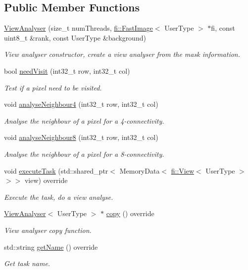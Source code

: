 \subsection*{Public Member Functions}
\begin{DoxyCompactItemize}
\item 
\hyperlink{classfc_1_1ViewAnalyser_a9bede8677246172230ddb1b70362d8a4}{View\+Analyser} (size\+\_\+t num\+Threads, \hyperlink{classfi_1_1FastImage}{fi\+::\+Fast\+Image}$<$ User\+Type $>$ $\ast$fi, const uint8\+\_\+t \&rank, const User\+Type \&background)
\begin{DoxyCompactList}\small\item\em View analyser constructor, create a view analyser from the mask information. \end{DoxyCompactList}\item 
bool \hyperlink{classfc_1_1ViewAnalyser_a3e64703fb8f40d4bb4953be268f1afb9}{need\+Visit} (int32\+\_\+t row, int32\+\_\+t col)
\begin{DoxyCompactList}\small\item\em Test if a pixel need to be visited. \end{DoxyCompactList}\item 
void \hyperlink{classfc_1_1ViewAnalyser_a8ae4286b034a9f4b99f7b629d5fbed95}{analyse\+Neighbour4} (int32\+\_\+t row, int32\+\_\+t col)
\begin{DoxyCompactList}\small\item\em Analyse the neighbour of a pixel for a 4-\/connectivity. \end{DoxyCompactList}\item 
void \hyperlink{classfc_1_1ViewAnalyser_ae29f29bef0e7b1b7ccc48f0f6be593ae}{analyse\+Neighbour8} (int32\+\_\+t row, int32\+\_\+t col)
\begin{DoxyCompactList}\small\item\em Analyse the neighbour of a pixel for a 8-\/connectivity. \end{DoxyCompactList}\item 
void \hyperlink{classfc_1_1ViewAnalyser_a21fcc5d0b61d0ea9eec739f5173fa0ee}{execute\+Task} (std\+::shared\+\_\+ptr$<$ Memory\+Data$<$ \hyperlink{classfi_1_1View}{fi\+::\+View}$<$ User\+Type $>$$>$$>$ view) override
\begin{DoxyCompactList}\small\item\em Execute the task, do a view analyse. \end{DoxyCompactList}\item 
\hyperlink{classfc_1_1ViewAnalyser}{View\+Analyser}$<$ User\+Type $>$ $\ast$ \hyperlink{classfc_1_1ViewAnalyser_a9ee0c5c4bbd93b191e62fb9633666e89}{copy} () override
\begin{DoxyCompactList}\small\item\em View analyser copy function. \end{DoxyCompactList}\item 
std\+::string \hyperlink{classfc_1_1ViewAnalyser_a30ab8c428e5922352be50ff56a14a71e}{get\+Name} () override
\begin{DoxyCompactList}\small\item\em Get task name. \end{DoxyCompactList}\end{DoxyCompactItemize}
